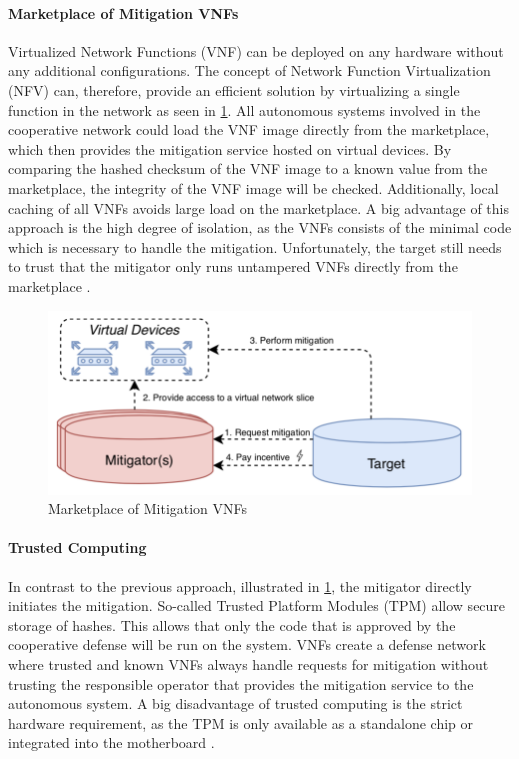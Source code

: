 \paragraph{Marketplace of Mitigation VNFs}
Virtualized  Network Functions (VNF) can be deployed on any hardware without any additional configurations. The concept of Network Function Virtualization (NFV) can, therefore, provide an efficient solution by virtualizing a single function in the network as seen in \ref{ddos_marketplace_vnf}. All autonomous systems involved in the cooperative network could load the VNF image directly from the marketplace, which then provides the mitigation service hosted on virtual devices. By comparing the hashed checksum of the VNF image to a known value from the marketplace, the integrity of the VNF image will be checked. Additionally, local caching of all VNFs avoids large load on the marketplace. A big advantage of this approach is the high degree of isolation, as the VNFs consists of the minimal code which is necessary to handle the mitigation. Unfortunately, the target still needs to trust that the mitigator only runs untampered VNFs directly from the marketplace \cite{Mannhart2018}.
\begin{figure}[ht]
  \begin{center}
    \includegraphics[scale=0.5]{Talk7/img/ddos/cooperative_network_marketplace_vnfs}
  \end{center}
  \caption{Marketplace of Mitigation VNFs}
  \label{ddos_marketplace_vnf}
\end{figure}

\paragraph{Trusted Computing}
In contrast to the previous approach, illustrated in \ref{ddos_marketplace_vnf}, the mitigator directly initiates the mitigation. So-called Trusted Platform Modules (TPM) allow secure storage of hashes. This allows that only the code that is approved by the cooperative defense will be run on the system. VNFs create a defense network where trusted and known VNFs always handle requests for mitigation without trusting the responsible operator that provides the mitigation service to the autonomous system.  A big disadvantage of trusted computing is the strict hardware requirement, as the TPM is only available as a standalone chip or integrated into the motherboard \cite{Mannhart2018}.

